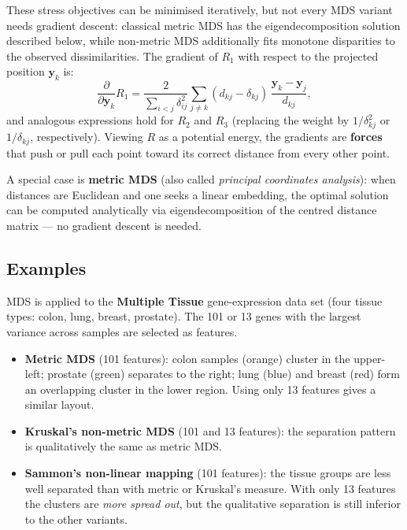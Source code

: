 \documentclass[11pt, oneside]{book}
\begin{document}
These stress objectives can be minimised iteratively, but not every MDS variant needs
gradient descent: classical metric MDS has the eigendecomposition solution described
below, while non-metric MDS additionally fits monotone disparities to the observed
dissimilarities.
The gradient of $R_1$ with respect to the projected position $\bm{y}_k$ is:
\[
  \frac{\partial}{\partial\bm{y}_k}R_1
  = \frac{2}{\sum_{i<j}\delta_{ij}^2}
    \sum_{j\neq k}(d_{kj}-\delta_{kj})\,\frac{\bm{y}_k-\bm{y}_j}{d_{kj}},
\]
and analogous expressions hold for $R_2$ and $R_3$ (replacing the weight by
$1/\delta_{kj}^2$ or $1/\delta_{kj}$, respectively).
Viewing $R$ as a potential energy, the gradients are \textbf{forces} that push
or pull each point toward its correct distance from every other point.

A special case is \textbf{metric MDS} (also called \emph{principal coordinates
analysis}): when distances are Euclidean and one seeks a linear embedding,
the optimal solution can be computed analytically via eigendecomposition of the
centred distance matrix — no gradient descent is needed.

\subsection{Examples}

MDS is applied to the \textbf{Multiple Tissue} gene-expression data set (four
tissue types: colon, lung, breast, prostate).
The 101 or 13 genes with the largest variance across samples are selected as
features.

\begin{itemize}
  \item \textbf{Metric MDS} (101 features): colon samples (orange) cluster in
        the upper-left; prostate (green) separates to the right; lung (blue) and
        breast (red) form an overlapping cluster in the lower region.
        Using only 13 features gives a similar layout.

  \item \textbf{Kruskal's non-metric MDS} (101 and 13 features): the
        separation pattern is qualitatively the same as metric MDS.

  \item \textbf{Sammon's non-linear mapping} (101 features): the tissue groups
        are less well separated than with metric or Kruskal's measure.
        With only 13 features the clusters are \emph{more spread out}, but the
        qualitative separation is still inferior to the other variants.
\end{itemize}
\end{document}
